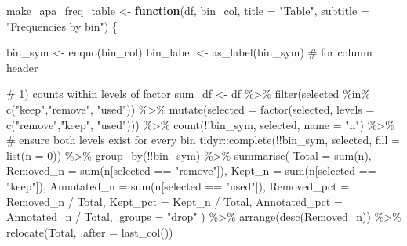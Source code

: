 \documentclass[
  man]{apa7}
\newenvironment{Shaded}{\begin{snugshade}}{\end{snugshade}}
\newcommand{\AttributeTok}[1]{\textcolor[rgb]{0.40,0.45,0.13}{#1}}
\newcommand{\CommentTok}[1]{\textcolor[rgb]{0.37,0.37,0.37}{#1}}
\newcommand{\ControlFlowTok}[1]{\textcolor[rgb]{0.00,0.23,0.31}{\textbf{#1}}}
\newcommand{\DecValTok}[1]{\textcolor[rgb]{0.68,0.00,0.00}{#1}}
\newcommand{\FunctionTok}[1]{\textcolor[rgb]{0.28,0.35,0.67}{#1}}
\newcommand{\NormalTok}[1]{\textcolor[rgb]{0.00,0.23,0.31}{#1}}
\newcommand{\OtherTok}[1]{\textcolor[rgb]{0.00,0.23,0.31}{#1}}
\newcommand{\SpecialCharTok}[1]{\textcolor[rgb]{0.37,0.37,0.37}{#1}}
\newcommand{\StringTok}[1]{\textcolor[rgb]{0.13,0.47,0.30}{#1}}
\begin{document}
\begin{Shaded}
\begin{Highlighting}[]
\NormalTok{make\_apa\_freq\_table }\OtherTok{\textless{}{-}} \ControlFlowTok{function}\NormalTok{(df, bin\_col,}
                                \AttributeTok{title =} \StringTok{"Table"}\NormalTok{,}
                                \AttributeTok{subtitle =} \StringTok{"Frequencies by bin"}\NormalTok{) \{}

\NormalTok{  bin\_sym   }\OtherTok{\textless{}{-}} \FunctionTok{enquo}\NormalTok{(bin\_col)}
\NormalTok{  bin\_label }\OtherTok{\textless{}{-}} \FunctionTok{as\_label}\NormalTok{(bin\_sym)   }\CommentTok{\# for column header}

  \CommentTok{\# 1) counts within levels of factor}
\NormalTok{  sum\_df }\OtherTok{\textless{}{-}}\NormalTok{ df }\SpecialCharTok{\%\textgreater{}\%}
    \FunctionTok{filter}\NormalTok{(selected }\SpecialCharTok{\%in\%} \FunctionTok{c}\NormalTok{(}\StringTok{"keep"}\NormalTok{,}\StringTok{"remove"}\NormalTok{, }\StringTok{"used"}\NormalTok{)) }\SpecialCharTok{\%\textgreater{}\%}
    \FunctionTok{mutate}\NormalTok{(}\AttributeTok{selected =} \FunctionTok{factor}\NormalTok{(selected, }\AttributeTok{levels =} \FunctionTok{c}\NormalTok{(}\StringTok{"remove"}\NormalTok{,}\StringTok{"keep"}\NormalTok{, }\StringTok{"used"}\NormalTok{))) }\SpecialCharTok{\%\textgreater{}\%}
    \FunctionTok{count}\NormalTok{(}\SpecialCharTok{!!}\NormalTok{bin\_sym, selected, }\AttributeTok{name =} \StringTok{"n"}\NormalTok{) }\SpecialCharTok{\%\textgreater{}\%}
    \CommentTok{\# ensure both levels exist for every bin}
\NormalTok{    tidyr}\SpecialCharTok{::}\FunctionTok{complete}\NormalTok{(}\SpecialCharTok{!!}\NormalTok{bin\_sym, selected, }\AttributeTok{fill =} \FunctionTok{list}\NormalTok{(}\AttributeTok{n =} \DecValTok{0}\NormalTok{)) }\SpecialCharTok{\%\textgreater{}\%}
    \FunctionTok{group\_by}\NormalTok{(}\SpecialCharTok{!!}\NormalTok{bin\_sym) }\SpecialCharTok{\%\textgreater{}\%}
    \FunctionTok{summarise}\NormalTok{(}
      \AttributeTok{Total        =} \FunctionTok{sum}\NormalTok{(n),}
      \AttributeTok{Removed\_n    =} \FunctionTok{sum}\NormalTok{(n[selected }\SpecialCharTok{==} \StringTok{"remove"}\NormalTok{]),}
      \AttributeTok{Kept\_n       =} \FunctionTok{sum}\NormalTok{(n[selected }\SpecialCharTok{==} \StringTok{"keep"}\NormalTok{]),}
      \AttributeTok{Annotated\_n  =} \FunctionTok{sum}\NormalTok{(n[selected }\SpecialCharTok{==} \StringTok{"used"}\NormalTok{]),}
      \AttributeTok{Removed\_pct  =}\NormalTok{ Removed\_n }\SpecialCharTok{/}\NormalTok{ Total,}
      \AttributeTok{Kept\_pct     =}\NormalTok{ Kept\_n }\SpecialCharTok{/}\NormalTok{ Total,}
      \AttributeTok{Annotated\_pct =}\NormalTok{ Annotated\_n }\SpecialCharTok{/}\NormalTok{ Total, }
      \AttributeTok{.groups =} \StringTok{"drop"}
\NormalTok{    ) }\SpecialCharTok{\%\textgreater{}\%}
    \FunctionTok{arrange}\NormalTok{(}\FunctionTok{desc}\NormalTok{(Removed\_n)) }\SpecialCharTok{\%\textgreater{}\%}
    \FunctionTok{relocate}\NormalTok{(Total, }\AttributeTok{.after =} \FunctionTok{last\_col}\NormalTok{())}


\end{Highlighting}
\end{Shaded}
\end{document}
